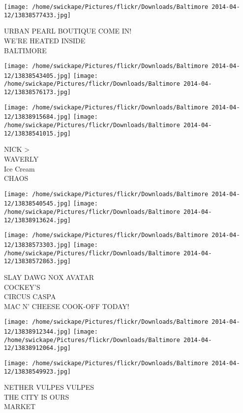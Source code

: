 \documentclass[10pt,letterpaper]{article}
\begin{document}
\vspace{0.25in}
\texttt{[image: /home/swickape/Pictures/flickr/Downloads/Baltimore 2014-04-12/13838577433.jpg]}

URBAN PEARL BOUTIQUE COME IN!\\
WE'RE HEATED INSIDE\\
BALTIMORE\\
\pagebreak

\texttt{[image: /home/swickape/Pictures/flickr/Downloads/Baltimore 2014-04-12/13838543405.jpg]}
\texttt{[image: /home/swickape/Pictures/flickr/Downloads/Baltimore 2014-04-12/13838576173.jpg]}

\texttt{[image: /home/swickape/Pictures/flickr/Downloads/Baltimore 2014-04-12/13838915684.jpg]}
\texttt{[image: /home/swickape/Pictures/flickr/Downloads/Baltimore 2014-04-12/13838541015.jpg]}

NICK >\\
WAVERLY\\
Ice Cream\\
CHAOS\\
\pagebreak

\texttt{[image: /home/swickape/Pictures/flickr/Downloads/Baltimore 2014-04-12/13838540545.jpg]}
\texttt{[image: /home/swickape/Pictures/flickr/Downloads/Baltimore 2014-04-12/13838913624.jpg]}

\texttt{[image: /home/swickape/Pictures/flickr/Downloads/Baltimore 2014-04-12/13838573303.jpg]}
\texttt{[image: /home/swickape/Pictures/flickr/Downloads/Baltimore 2014-04-12/13838572863.jpg]}

SLAY DAWG NOX AVATAR\\
COCKEY'S\\
CIRCUS CASPA\\
MAC N' CHEESE COOK{-}OFF TODAY!\\
\pagebreak

\texttt{[image: /home/swickape/Pictures/flickr/Downloads/Baltimore 2014-04-12/13838912344.jpg]}
\texttt{[image: /home/swickape/Pictures/flickr/Downloads/Baltimore 2014-04-12/13838912064.jpg]}

\texttt{[image: /home/swickape/Pictures/flickr/Downloads/Baltimore 2014-04-12/13838549923.jpg]}

NETHER VULPES VULPES\\
THE CITY IS OURS\\
MARKET\\
\pagebreak
\end{document}
